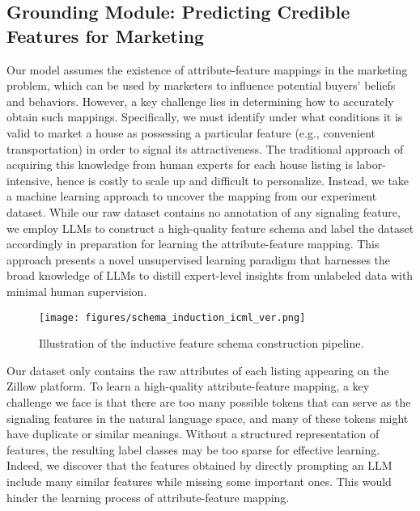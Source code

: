 \subsection{Grounding Module: Predicting Credible Features for Marketing}
\label{sec: highlight_model}
Our model assumes the existence of attribute-feature mappings in the marketing problem,  which can be used by marketers to influence potential buyers' beliefs and behaviors. However, a key challenge lies in determining how to accurately obtain such mappings. Specifically, we must identify under what conditions it is valid to market a house as possessing a particular feature (e.g., convenient transportation) in order to signal its attractiveness. The traditional approach of acquiring this knowledge from human experts for each house listing is labor-intensive, hence is costly to scale up and difficult to personalize.  
Instead, we take a machine learning approach to uncover the mapping from our experiment dataset. 
While our raw dataset contains no annotation of any signaling feature, we employ LLMs to construct a high-quality feature schema and label the dataset accordingly in preparation for learning the attribute-feature mapping. 
This approach presents a novel unsupervised learning paradigm that harnesses the broad knowledge of LLMs to distill expert-level insights from unlabeled data with minimal human supervision.

\begin{figure*}[h]
    \centering
    \texttt{[image: figures/schema\_induction\_icml\_ver.png]}
    \caption{Illustration of the inductive feature schema construction pipeline.  }
    \label{fig:highlight_model_pipeline}
\end{figure*}

Our dataset only contains the raw attributes of each listing appearing on the Zillow platform. To learn a high-quality attribute-feature mapping, a key challenge we face is 
that there are too many possible tokens that can serve as the signaling features in the natural language space, and many of these tokens might have duplicate or similar meanings. Without a structured representation of features, the resulting label classes may be too sparse for effective learning. Indeed, we discover that the features obtained by directly prompting an LLM include many similar features while missing some important ones. This would hinder the learning process of attribute-feature mapping. 

